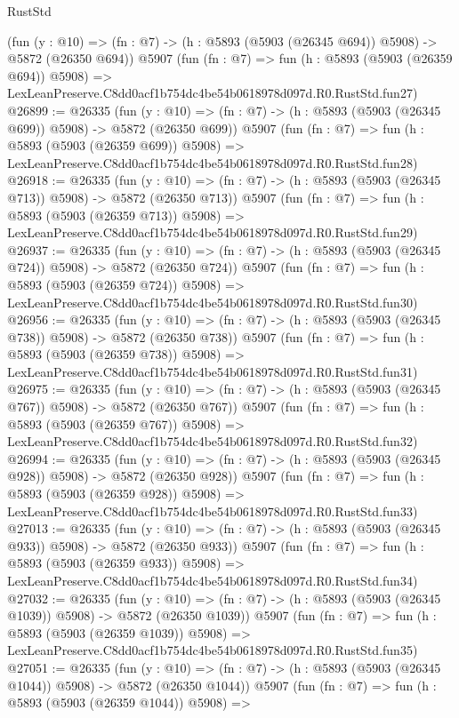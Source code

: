 \begin{lexlean}{RustStd}
\begin{coremodule}
    (fun (y : @10) => (fn : @7) -> (h : @5893 (@5903 (@26345 @694)) @5908) -> @5872 (@26350 @694))
    @5907
    (fun (fn : @7) =>
    fun (h : @5893 (@5903 (@26359 @694)) @5908) =>
    LexLeanPreserve.C8dd0acf1b754dc4be54b0618978d097d.R0.RustStd.fun27)
@26899 := @26335
    (fun (y : @10) => (fn : @7) -> (h : @5893 (@5903 (@26345 @699)) @5908) -> @5872 (@26350 @699))
    @5907
    (fun (fn : @7) =>
    fun (h : @5893 (@5903 (@26359 @699)) @5908) =>
    LexLeanPreserve.C8dd0acf1b754dc4be54b0618978d097d.R0.RustStd.fun28)
@26918 := @26335
    (fun (y : @10) => (fn : @7) -> (h : @5893 (@5903 (@26345 @713)) @5908) -> @5872 (@26350 @713))
    @5907
    (fun (fn : @7) =>
    fun (h : @5893 (@5903 (@26359 @713)) @5908) =>
    LexLeanPreserve.C8dd0acf1b754dc4be54b0618978d097d.R0.RustStd.fun29)
@26937 := @26335
    (fun (y : @10) => (fn : @7) -> (h : @5893 (@5903 (@26345 @724)) @5908) -> @5872 (@26350 @724))
    @5907
    (fun (fn : @7) =>
    fun (h : @5893 (@5903 (@26359 @724)) @5908) =>
    LexLeanPreserve.C8dd0acf1b754dc4be54b0618978d097d.R0.RustStd.fun30)
@26956 := @26335
    (fun (y : @10) => (fn : @7) -> (h : @5893 (@5903 (@26345 @738)) @5908) -> @5872 (@26350 @738))
    @5907
    (fun (fn : @7) =>
    fun (h : @5893 (@5903 (@26359 @738)) @5908) =>
    LexLeanPreserve.C8dd0acf1b754dc4be54b0618978d097d.R0.RustStd.fun31)
@26975 := @26335
    (fun (y : @10) => (fn : @7) -> (h : @5893 (@5903 (@26345 @767)) @5908) -> @5872 (@26350 @767))
    @5907
    (fun (fn : @7) =>
    fun (h : @5893 (@5903 (@26359 @767)) @5908) =>
    LexLeanPreserve.C8dd0acf1b754dc4be54b0618978d097d.R0.RustStd.fun32)
@26994 := @26335
    (fun (y : @10) => (fn : @7) -> (h : @5893 (@5903 (@26345 @928)) @5908) -> @5872 (@26350 @928))
    @5907
    (fun (fn : @7) =>
    fun (h : @5893 (@5903 (@26359 @928)) @5908) =>
    LexLeanPreserve.C8dd0acf1b754dc4be54b0618978d097d.R0.RustStd.fun33)
@27013 := @26335
    (fun (y : @10) => (fn : @7) -> (h : @5893 (@5903 (@26345 @933)) @5908) -> @5872 (@26350 @933))
    @5907
    (fun (fn : @7) =>
    fun (h : @5893 (@5903 (@26359 @933)) @5908) =>
    LexLeanPreserve.C8dd0acf1b754dc4be54b0618978d097d.R0.RustStd.fun34)
@27032 := @26335
    (fun (y : @10) => (fn : @7) -> (h : @5893 (@5903 (@26345 @1039)) @5908) -> @5872 (@26350 @1039))
    @5907
    (fun (fn : @7) =>
    fun (h : @5893 (@5903 (@26359 @1039)) @5908) =>
    LexLeanPreserve.C8dd0acf1b754dc4be54b0618978d097d.R0.RustStd.fun35)
@27051 := @26335
    (fun (y : @10) => (fn : @7) -> (h : @5893 (@5903 (@26345 @1044)) @5908) -> @5872 (@26350 @1044))
    @5907
    (fun (fn : @7) =>
    fun (h : @5893 (@5903 (@26359 @1044)) @5908) =>

\end{coremodule}
\end{lexlean}
